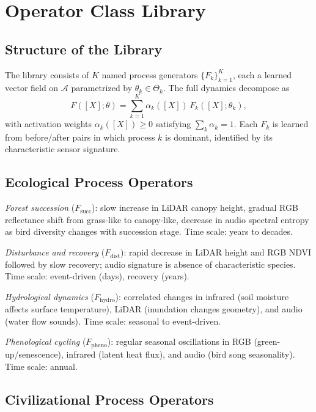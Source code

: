 \documentclass[12pt, oneside]{article}
\begin{document}
\section{Operator Class Library}
\label{app:operators}

\subsection{Structure of the Library}

The library consists of $K$ named process generators $\{F_k\}_{k=1}^K$, each a learned
vector field on $\mathcal{A}$ parametrized by $\theta_k \in \Theta_k$. The full dynamics
decompose as
\[
F([X];\theta) = \sum_{k=1}^K \alpha_k([X])\, F_k([X];\theta_k),
\]
with activation weights $\alpha_k([X]) \ge 0$ satisfying $\sum_k \alpha_k = 1$. Each
$F_k$ is learned from before/after pairs in which process $k$ is dominant, identified by
its characteristic sensor signature.

\subsection{Ecological Process Operators}

\emph{Forest succession} ($F_{\mathrm{succ}}$): slow increase in LiDAR canopy height,
gradual RGB reflectance shift from grass-like to canopy-like, decrease in audio spectral
entropy as bird diversity changes with succession stage. Time scale: years to decades.

\emph{Disturbance and recovery} ($F_{\mathrm{dist}}$): rapid decrease in LiDAR height
and RGB NDVI followed by slow recovery; audio signature is absence of characteristic
species. Time scale: event-driven (days), recovery (years).

\emph{Hydrological dynamics} ($F_{\mathrm{hydro}}$): correlated changes in infrared
(soil moisture affects surface temperature), LiDAR (inundation changes geometry), and
audio (water flow sounds). Time scale: seasonal to event-driven.

\emph{Phenological cycling} ($F_{\mathrm{pheno}}$): regular seasonal oscillations in RGB
(green-up/senescence), infrared (latent heat flux), and audio (bird song seasonality).
Time scale: annual.

\subsection{Civilizational Process Operators}
\end{document}
